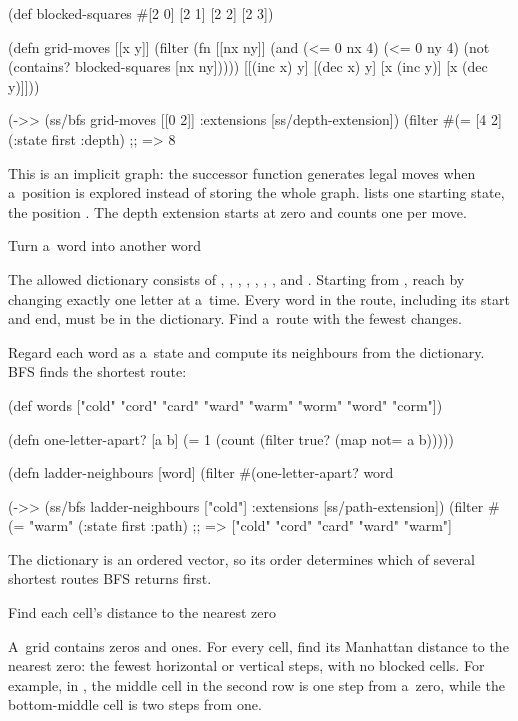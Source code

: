 \begtt {}
(def blocked-squares #{[2 0] [2 1] [2 2] [2 3]})

(defn grid-moves [[x y]]
  (filter (fn [[nx ny]]
            (and (<= 0 nx 4)
                 (<= 0 ny 4)
                 (not (contains? blocked-squares [nx ny]))))
          [[(inc x) y] [(dec x) y] [x (inc y)] [x (dec y)]]))

(->> (ss/bfs grid-moves [[0 2]]
                 {:extensions [ss/depth-extension]})
     (filter #(= [4 2] (:state %
     first
     :depth)
;; => 8
\endtt

This is an implicit graph: the successor function generates legal moves
when a~position is explored instead of storing the whole graph.
\code{[[0 2]]} lists one starting state, the position \code{[0 2]}.
The depth extension starts at zero and counts one per move.

\secc Turn a~word into another word

 The allowed dictionary consists of ,
, , , , ,
, and . Starting from , reach 
by changing exactly one letter at a~time. Every word in the route,
including its start and end, must be in the dictionary. Find a~route with
the fewest changes.

\smallskip
{} Regard each word as a~state and compute its
neighbours from the dictionary. BFS finds the shortest route:

\begtt {}
(def words ["cold" "cord" "card" "ward" "warm"
            "worm" "word" "corm"])

(defn one-letter-apart? [a b]
  (= 1 (count (filter true? (map not= a b)))))

(defn ladder-neighbours [word]
  (filter #(one-letter-apart? word %

(->> (ss/bfs ladder-neighbours ["cold"]
                 {:extensions [ss/path-extension]})
     (filter #(= "warm" (:state %
     first
     :path)
;; => ["cold" "cord" "card" "ward" "warm"]
\endtt

The dictionary is an ordered vector, so its order
determines which of several shortest routes BFS returns first.

\secc Find each cell's distance to the nearest zero

 A~grid contains zeros and ones. For every cell,
find its Manhattan distance to the nearest zero: the fewest horizontal or
vertical steps, with no blocked cells. For example, in
\code{["000" "010" "111"]}, the middle cell in the second row is one step
from a~zero, while the bottom-middle cell is two steps from one.

